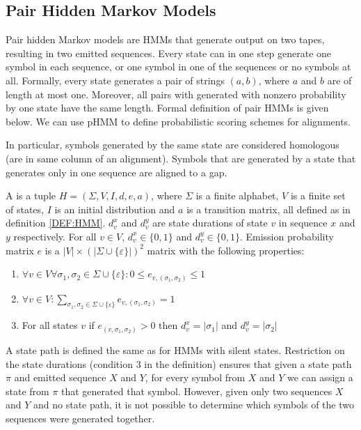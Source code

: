 \subsection{Pair Hidden Markov Models}\label{SECTION:PAIRHMM}

Pair hidden Markov models are HMMs that generate output on two tapes, resulting
in two emitted sequences.  Every state can in one step generate one symbol in
each sequence, or one symbol in one of the sequences or no symbols at all.
Formally, every state generates a pair of strings $(a,b)$, where $a$ and $b$
are of length at most one.  Moreover, all pairs with generated with nonzero
probability by one state have the same length.  Formal definition of pair HMMs
is given below. We can use pHMM to define probabilistic scoring schemes for
alignments.

In particular, symbols generated by the same state are considered homologous
(are in same column of an alignment). Symbols that are generated by a state
that generates only in one sequence are aligned to a gap. 

\begin{definition}
A  is a tuple $H=(\Sigma,V,I,d,e,a)$, where $\Sigma$ is a finite
alphabet, $V$ is a finite set of states, $I$ is an initial distribution and $a$ is
a transition matrix, all defined as
in definition \ref{DEF:HMM}. $d^x_v$ and $d^y_v$ are state durations of state $v$
in sequence $x$ and $y$ respectively. For all $v\in V$,
$d^x_v\in \{0,1\}$ and $d^y_v\in \{0,1\}$.
Emission probability matrix $e$ is
a $|V|\times\left(|\Sigma\cup\{\varepsilon\}|\right)^2$ matrix with the following
properties:
\def\lala#1{\{#1\}}
\begin{enumerate}[itemsep=-1mm]
\item
$\forall v\in V\forall \sigma_1,\sigma_2\in\Sigma\cup\{\varepsilon\}:
0\leq e_{v,(\sigma_1,\sigma_2)}\leq 1$

\item 
$\forall v\in V:
\sum_{\sigma_1,\sigma_2\in\Sigma\cup \lala{\varepsilon }}e_{v,(\sigma_1,\sigma_2)} = 1$

\item For all states $v$ if $e_{(v,\sigma_1,\sigma_2)}>0$ then
$d^x_v=|\sigma_1|$ and $d^y_v=|\sigma_2|$
\end{enumerate}

\end{definition}

A state path is defined the same as for HMMs with silent states. Restriction on
the state durations (condition $3$ in the definition) ensures that given a
state path $\pi$ and emitted sequence $X$ and $Y$, for every symbol from $X$
and $Y$ we can assign a state from $\pi$ that generated that symbol.  However,
given only two sequences $X$ and $Y$ and no state path, it is not possible to
determine which symbols of the two sequences were generated together.


